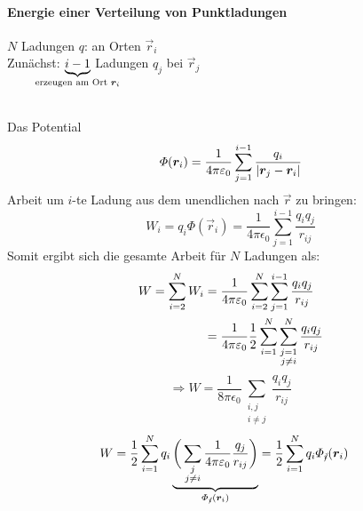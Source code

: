 \paragraph{Energie einer Verteilung von Punktladungen}

\begin{minipage}{.6\linewidth}
	$N$ Ladungen $q$: an Orten $\vec{r}_i$\\
	Zunächst: $\underbrace{i - 1}_{\mathclap{\textrm{erzeugen am Ort } \vec{r}_i}}$ Ladungen $q_j$ bei $\vec{r}_j$
\end{minipage}%
\begin{minipage}{.4\linewidth}
	\flushright
\end{minipage}%
\\
Das Potential
$$\varPhi(\bm{r}_i) = \frac{1}{4\pi\varepsilon_0} \sum_{j = 1}^{i - 1} \frac{q_i}{|\bm{r}_j - \bm{r}_i|}$$ 
Arbeit um $ i $-te Ladung aus dem unendlichen nach $ \vec{r} $ zu bringen:
\begin{equation*}
W_i = q_i \Phi(\vec{r}_i) = \frac{1}{4 \pi \epsilon_0} \sum_{j=1}^{i-1} \frac{q_i q_j}{r_{ij}}
\end{equation*}
Somit ergibt sich die gesamte Arbeit für $ N $ Ladungen als:
\begin{align*}
W = \sum_{i=2}^{N} W_i &= \frac{1}{4 \pi \varepsilon_0} \sum_{i=2}^{N} \sum_{j=1}^{i-1} \frac{q_i q_j}{r_{ij}}\\
&= \frac{1}{4\pi\varepsilon_0} \frac{1}{2} \sum_{i=1}^{N} \sum_{\substack{j=1 \\ j\neq i}}^{N} \frac{q_i q_j}{r_{ij}}
\end{align*}
\begin{equation*}
\Rightarrow W = \frac{1}{8 \pi \epsilon_0} \sum_{\substack{i,j\\i\neq j}} \frac{q_i q_j}{r_{ij}}
\end{equation*}
\begin{align*}
W &= \frac{1}{2} \sum_{i = 1}^{N} q_i \underbrace{\bigg( \sum_{\substack{j\\ j \neq i}} \frac{1}{4\pi\varepsilon_0} \frac{q_j}{r_{ij}}\bigg)}_{\varPhi_{/ \hspace{-3.5pt}i}(\bm{r}_i)} = \frac{1}{2} \sum_{i = 1}^{N} q_i \varPhi_{/ \hspace{-4pt}i}(\bm{r}_i)
\end{align*}

